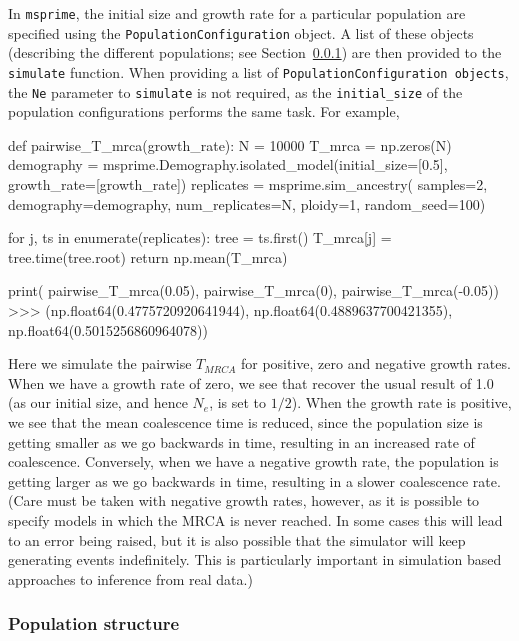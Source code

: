 \documentclass[graybox]{svmult}
\newcommand{\msprime}[0]{\texttt{msprime}}
\begin{document}
In \msprime, the initial size and growth rate for a particular population
are specified using the \texttt{PopulationConfiguration} object. A list
of these objects (describing the different populations; see
Section~\ref{population-structure}) are then provided to the
\texttt{simulate}
function. When providing a list of
\texttt{PopulationConfiguration\ objects}, the \texttt{Ne} parameter to
\texttt{simulate} is not required, as the \texttt{initial\_size} of the
population configurations performs the same task. For example,

\begin{pythoncode}
def pairwise_T_mrca(growth_rate):
    N = 10000
    T_mrca = np.zeros(N)
    demography = msprime.Demography.isolated_model(initial_size=[0.5],
                                                   growth_rate=[growth_rate])
    replicates = msprime.sim_ancestry(
        samples=2,
        demography=demography,
        num_replicates=N,
        ploidy=1,
        random_seed=100)

    for j, ts in enumerate(replicates):
        tree = ts.first()
        T_mrca[j] = tree.time(tree.root)
    return np.mean(T_mrca)

print(
    pairwise_T_mrca(0.05), pairwise_T_mrca(0),
    pairwise_T_mrca(-0.05))
>>> (np.float64(0.4775720920641944),
     np.float64(0.4889637700421355),
     np.float64(0.5015256860964078))
\end{pythoncode}

    Here we simulate the pairwise \(T_{MRCA}\) for positive, zero and
negative growth rates. When we have a growth rate of zero, we see that
recover the usual result of 1.0 (as our initial size, and hence \(N_e\),
is set to \(1/2\)). When the growth rate is positive, we see that the
mean coalescence time is reduced, since the population size is getting
smaller as we go backwards in time, resulting in an increased rate of
coalescence. Conversely, when we have a negative growth rate, the
population is getting larger as we go backwards in time, resulting in a
slower coalescence rate. (Care must be taken with negative growth rates,
however, as it is possible to specify models in which the MRCA is never
reached. In some cases this will lead to an error being raised, but it
is also possible that the simulator will keep generating events
indefinitely. This is particularly important in simulation based
approaches to inference from real data.)


\subsubsection{Population structure}\label{population-structure}
\end{document}
